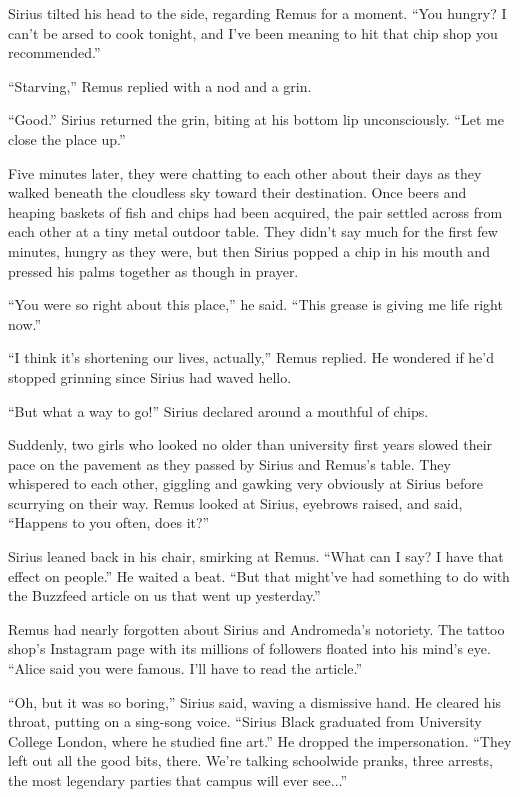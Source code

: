 Sirius tilted his head to the side, regarding Remus for a moment. “You hungry? I can’t be arsed to cook tonight, and I’ve been meaning to hit that chip shop you recommended.”

“Starving,” Remus replied with a nod and a grin.

“Good.” Sirius returned the grin, biting at his bottom lip unconsciously. “Let me close the place up.”

Five minutes later, they were chatting to each other about their days as they walked beneath the cloudless sky toward their destination. Once beers and heaping baskets of fish and chips had been acquired, the pair settled across from each other at a tiny metal outdoor table. They didn’t say much for the first few minutes, hungry as they were, but then Sirius popped a chip in his mouth and pressed his palms together as though in prayer.

“You were so right about this place,” he said. “This grease is giving me life right now.”

“I think it’s shortening our lives, actually,” Remus replied. He wondered if he’d stopped grinning since Sirius had waved hello.

“But what a way to go!” Sirius declared around a mouthful of chips.

Suddenly, two girls who looked no older than university first years slowed their pace on the pavement as they passed by Sirius and Remus’s table. They whispered to each other, giggling and gawking very obviously at Sirius before scurrying on their way. Remus looked at Sirius, eyebrows raised, and said, “Happens to you often, does it?”

Sirius leaned back in his chair, smirking at Remus. “What can I say? I have that effect on people.” He waited a beat. “But that might’ve had something to do with the Buzzfeed article on us that went up yesterday.”

Remus had nearly forgotten about Sirius and Andromeda’s notoriety. The tattoo shop’s Instagram page with its millions of followers floated into his mind’s eye. “Alice said you were famous. I’ll have to read the article.”

“Oh, but it was so boring,” Sirius said, waving a dismissive hand. He cleared his throat, putting on a sing-song voice. “Sirius Black graduated from University College London, where he studied fine art.” He dropped the impersonation. “They left out all the good bits, there. We’re talking schoolwide pranks, three arrests, the most legendary parties that campus will ever see...”


